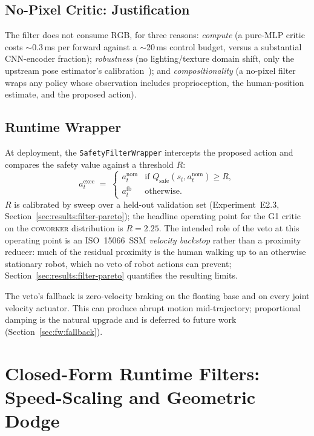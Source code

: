 \documentclass[11pt,a4paper]{report}
\newcommand{\ssm}{SSM}
\newcommand{\iso}{ISO~15066}
\newcommand{\coworker}{\textsc{coworker}}
\begin{document}
\subsection{No-Pixel Critic: Justification}
\label{sec:method:filter:nopixels}

The filter does not consume RGB, for three reasons: \emph{compute}
(a pure-MLP critic costs $\sim$0.3\,ms per forward against a
$\sim$20\,ms control budget, versus a substantial CNN-encoder
fraction); \emph{robustness} (no lighting/texture domain shift, only
the upstream pose estimator's
calibration~\cite{henning2023bodyslampp}); and
\emph{compositionality} (a no-pixel filter wraps any policy whose
observation includes proprioception, the human-position estimate,
and the proposed action).

\subsection{Runtime Wrapper}
\label{sec:method:filter:runtime}

At deployment, the \texttt{SafetyFilterWrapper} intercepts the
proposed action and compares the safety value against a threshold
$R$:
\begin{equation}
  a^{\mathrm{exec}}_t \;=\;
  \begin{cases}
    a^{\mathrm{nom}}_t   & \text{if } Q_{\mathrm{safe}}(s_t, a^{\mathrm{nom}}_t) \ge R, \\
    a^{\mathrm{fb}}_t    & \text{otherwise.}
  \end{cases}
  \label{eq:filter-rule}
\end{equation}
$R$ is calibrated by sweep over a held-out validation set
(Experiment~E2.3, Section~\ref{sec:results:filter-pareto}); the
headline operating point for the G1 critic on the \coworker{}
distribution is $R = 2.25$. The intended role of the veto at this
operating point is an \iso{}~\ssm{} \emph{velocity backstop} rather
than a proximity reducer: much of the residual proximity is the
human walking up to an otherwise stationary robot, which no veto of
robot actions can prevent; Section~\ref{sec:results:filter-pareto}
quantifies the resulting limits.

The veto's fallback is zero-velocity braking on the floating base
and on every joint velocity actuator. This can produce abrupt
motion mid-trajectory; proportional damping is the natural upgrade
and is deferred to future work (Section~\ref{sec:fw:fallback}).

\section{Closed-Form Runtime Filters: Speed-Scaling and Geometric Dodge}
\label{sec:method:filter:closedform}
\end{document}

